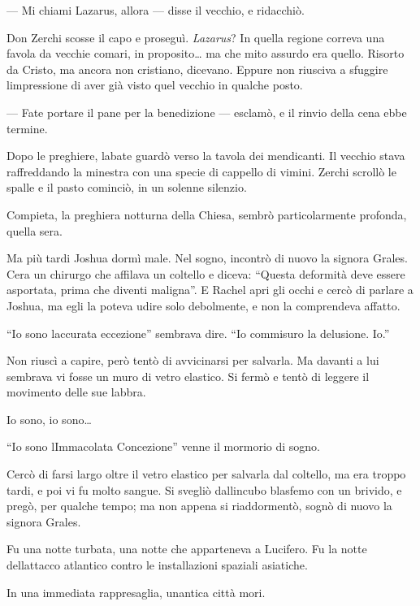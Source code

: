 --- Mi chiami Lazarus, allora --- disse il vecchio, e ridacchiò.

Don Zerchi scosse il capo e proseguì. \emph{Lazarus}? In quella regione
correva una favola da vecchie comari, in proposito\ldots{} ma che mito
assurdo era quello. Risorto da Cristo, ma ancora non cristiano,
dicevano. Eppure non riusciva a sfuggire l\textquotesingle impressione
di aver già visto quel vecchio in qualche posto.

--- Fate portare il pane per la benedizione --- esclamò, e il rinvio
della cena ebbe termine.

Dopo le preghiere, l\textquotesingle abate guardò verso la tavola dei
mendicanti. Il vecchio stava raffreddando la minestra con una specie di
cappello di vimini. Zerchi scrollò le spalle e il pasto cominciò, in un
solenne silenzio.

Compieta, la preghiera notturna della Chiesa, sembrò particolarmente
profonda, quella sera.

Ma più tardi Joshua dormì male. Nel sogno, incontrò di nuovo la signora
Grales. C\textquotesingle era un chirurgo che affilava un coltello e
diceva: ``Questa deformità deve essere asportata, prima che diventi
maligna''. E Rachel apri gli occhi e cercò di parlare a Joshua, ma egli
la poteva udire solo debolmente, e non la comprendeva affatto.

``Io sono l\textquotesingle accurata eccezione'' sembrava dire. ``Io
commisuro la delusione. Io.''

Non riuscì a capire, però tentò di avvicinarsi per salvarla. Ma davanti
a lui sembrava vi fosse un muro di vetro elastico. Si fermò e tentò di
leggere il movimento delle sue labbra.

Io sono, io sono\ldots{}

``Io sono l\textquotesingle Immacolata Concezione'' venne il mormorio di
sogno.

Cercò di farsi largo oltre il vetro elastico per salvarla dal coltello,
ma era troppo tardi, e poi vi fu molto sangue. Si svegliò
dall\textquotesingle incubo blasfemo con un brivido, e pregò, per
qualche tempo; ma non appena si riaddormentò, sognò di nuovo la signora
Grales.

Fu una notte turbata, una notte che apparteneva a Lucifero. Fu la notte
dell\textquotesingle attacco atlantico contro le installazioni spaziali
asiatiche.

In una immediata rappresaglia, un\textquotesingle antica città mori.
